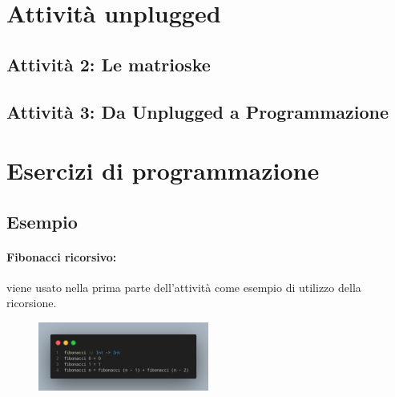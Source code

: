 
\section{Attività unplugged}\label{unplugged}

\subsection{Attività 2: Le matrioske}

\subsection{Attività 3: Da Unplugged a Programmazione}

\pagebreak

\section{Esercizi di programmazione}\label{prog}

\subsection{Esempio}

\paragraph{Fibonacci ricorsivo:} viene usato nella prima parte dell'attività come esempio
di utilizzo della ricorsione.

\begin{figure}[!h]
    \centering
    \includegraphics[width=0.5\textwidth]{images/Fibonacci.png}
\end{figure}

